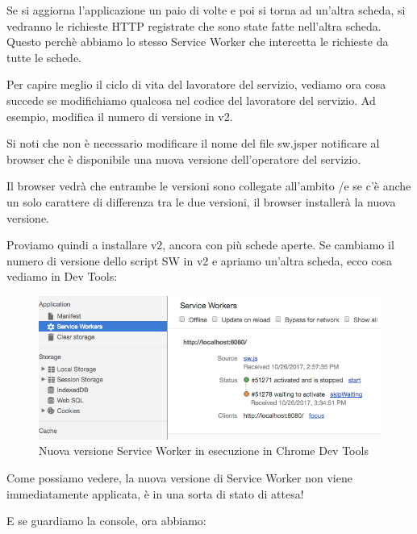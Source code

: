 \documentclass[italian]{article}
\begin{document}
Se si aggiorna l'applicazione un paio di volte e poi si torna ad un'altra scheda, si vedranno le richieste HTTP registrate che sono state fatte nell'altra scheda. Questo perchè abbiamo lo stesso Service Worker che intercetta le richieste da tutte le schede.


Per capire meglio il ciclo di vita del lavoratore del servizio, vediamo ora cosa succede se modifichiamo qualcosa nel codice del lavoratore del servizio. Ad esempio, modifica il numero di versione in v2.

Si noti che non è necessario modificare il nome del file sw.jsper notificare al browser che è disponibile una nuova versione dell'operatore del servizio.

Il browser vedrà che entrambe le versioni sono collegate all'ambito /e se c'è anche un solo carattere di differenza tra le due versioni, il browser installerà la nuova versione.

Proviamo quindi a installare v2, ancora con più schede aperte. Se cambiamo il numero di versione dello script SW in v2 e apriamo un'altra scheda, ecco cosa vediamo in Dev Tools:
\begin{figure}
	\centering
	\includegraphics[width=1\linewidth]{DevTools2}
	\caption{Nuova versione Service Worker in esecuzione in Chrome Dev Tools}
	\label{fig:Nuova versione Service Worker in esecuzione in Chrome Dev Tools}
\end{figure}
Come possiamo vedere, la nuova versione di Service Worker non viene immediatamente applicata, è in una sorta di stato di attesa!

E se guardiamo la console, ora abbiamo:
\end{document}
